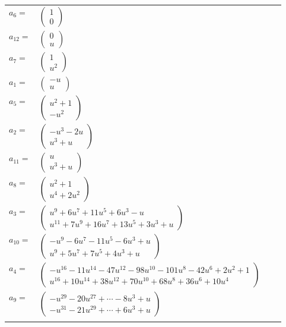 \documentclass[1p]{elsarticle_modified}
\theoremstyle{definition}
\begin{document}
\begin{tabular}{m{7pt} m{180pt} m{7pt} m{180pt} }
\flushright $a_{6}=$&$\begin{pmatrix}1\\0\end{pmatrix}$ \\
\flushright $a_{12}=$&$\begin{pmatrix}0\\u\end{pmatrix}$ \\
\flushright $a_{7}=$&$\begin{pmatrix}1\\u^2\end{pmatrix}$ \\
\flushright $a_{1}=$&$\begin{pmatrix}- u\\u\end{pmatrix}$ \\
\flushright $a_{5}=$&$\begin{pmatrix}u^2+1\\- u^2\end{pmatrix}$ \\
\flushright $a_{2}=$&$\begin{pmatrix}- u^3-2 u\\u^3+u\end{pmatrix}$ \\
\flushright $a_{11}=$&$\begin{pmatrix}u\\u^3+u\end{pmatrix}$ \\
\flushright $a_{8}=$&$\begin{pmatrix}u^2+1\\u^4+2 u^2\end{pmatrix}$ \\
\flushright $a_{3}=$&$\begin{pmatrix}u^9+6 u^7+11 u^5+6 u^3- u\\u^{11}+7 u^9+16 u^7+13 u^5+3 u^3+u\end{pmatrix}$ \\
\flushright $a_{10}=$&$\begin{pmatrix}- u^9-6 u^7-11 u^5-6 u^3+u\\u^9+5 u^7+7 u^5+4 u^3+u\end{pmatrix}$ \\
\flushright $a_{4}=$&$\begin{pmatrix}- u^{16}-11 u^{14}-47 u^{12}-98 u^{10}-101 u^8-42 u^6+2 u^2+1\\u^{16}+10 u^{14}+38 u^{12}+70 u^{10}+68 u^8+36 u^6+10 u^4\end{pmatrix}$ \\
\flushright $a_{9}=$&$\begin{pmatrix}- u^{29}-20 u^{27}+\cdots-8 u^3+u\\- u^{31}-21 u^{29}+\cdots+6 u^3+u\end{pmatrix}$\\&\end{tabular}
\end{document}
